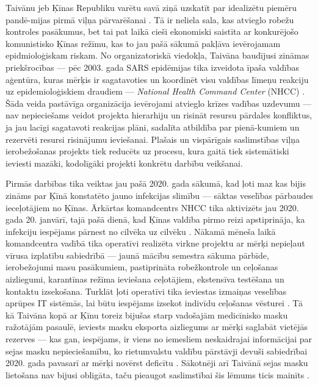\documentclass[12pt, a4paper]{article}
\numberwithin{equation}{section} %
\begin{document}
Taivānu jeb Ķīnas Republiku varētu savā ziņā uzskatīt par idealizētu piemēru pandē-mijas pirmā viļņa pārvarēšanai \cite{Taiwan_wave_1}. Tā ir neliela sala, kas atvieglo robežu kontroles pasākumus, bet tai pat laikā cieši ekonomiski saistīta ar konkurējošo komunistisko Ķīnas režīmu, kas to jau pašā sākumā pakļāva ievērojamam epidmioloģiskam riskam. No organizatoriskā viedokļa, Taivāna baudījusi zināmas priekšrocības --- pēc 2003. gada SARS epidēmijas tika izveidota īpaša valdības aģentūra, kuras mērķis ir sagatavoties un koordinēt visu valdības līmeņu reakciju uz epidemioloģiskiem draudiem --- \textit{National Health Command Center} (NHCC) \cite{wang2020response}. Šāda veida pastāvīga organizācija ievērojami atvieglo krīzes vadības uzdevumu --- nav nepieciešams veidot projekta hierarhiju un risināt resursu pārdales konfliktus, ja jau lacīgi sagatavoti reakcijas plāni, sadalīta atbildība par pienā-kumiem un rezervēti resursi risinājumu ieviešanai. Plašais un vispārīgais saslimstības viļņa ierobežošanas projekts tiek reducēts uz procesu, kura gaitā tiek sistemātiski ieviesti mazāki, kodolīgāki projekti konkrētu darbību veikšanai. 

Pirmās darbības tika veiktas jau pašā 2020. gada sākumā, kad ļoti maz kas bijis zināms par Ķīnā konstatēto jauno infekcijas slimību --- sāktas veselības pārbaudes ieceļotājiem no Ķīnas. Ārkārtas komandcentrs NHCC tika aktivizēts jau 2020. gada 20. janvārī, tajā pašā dienā, kad Ķīnas valdība pirmo reizi apstiprināja, ka infekciju iespējams pārnest no cilvēka uz cilvēku \cite{human_human}. Nākamā mēneša laikā komandcentra vadībā tika operatīvi realizēta virkne projektu ar mērķi nepieļaut vīrusa izplatību sabiedrībā --- jaunā mācību semestra sākuma pārbīde, ierobežojumi masu pasākumiem, pastiprināta robežkontrole un ceļošanas aizliegumi, karantīnas režīma ieviešana ceļotājiem, ekstensīva testēšana un kontaktu izsekošana. Turklāt ļoti operatīvi tika ieviestas izmaiņas veselības aprūpes IT sistēmās, lai būtu iespējams izsekot indivīdu ceļošanas vēsturei \cite{wang2020response}. Tā kā Taivāna kopā ar Ķīnu toreiz bijušas starp vadošajām medicīnisko masku ražotājām pasaulē, ieviests masku eksporta aizliegums ar mērķi saglabāt vietējās rezerves \cite{export_ban} --- kas gan, iespējams, ir viens no iemesliem neskaidrajai informācijai par sejas masku nepieciešamību, ko rietumvalstu valdību pārstāvji devuši sabiedrībai 2020. gada pavasarī ar mērķi novērst deficītu \cite{backfired}. Sākotnēji arī Taivānā sejas masku lietošana nav bijusi obligāta, taču pieaugot saslimstībai šis lēmums ticis mainīts \cite{taiwan_mask}. 
\end{document}

